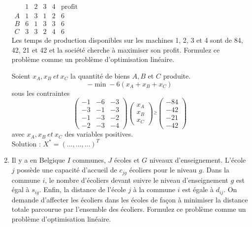 \begin{enumerate}
    $
    \begin{array}{l|llll|l}
      & 1 & 2 & 3 & 4 & \mbox{profit}\\
      \hline
      A & 1 & 3 & 1 & 2 & 6\\
      B & 6 & 1 & 3 & 3 & 6\\
      C & 3 & 3 & 2 & 4 & 6
    \end{array}
    $
    \\


    Les temps de production disponibles sur les machines 1, 2, 3 et 4  sont de 84, 42, 21 et 42 et la société cherche à  maximiser son
    profit. Formulez ce problème comme un problème d'optimisation linéaire.

    \begin{solution}
      Soient $x_{A}, x_{B}~et~x_{C}$ la quantité de biens $A, B$ et $C$ produite. \\
      $$- \min -6(x_{A} + x_{B} + x_{C})$$
      sous les contraintes \\
      \[
        \begin{pmatrix}
          -1 & -6 & -3\\
          -3 & -1 & -3\\
          -1 & -3 & -2\\
          -2 & -3 & -4
        \end{pmatrix}
        \begin{pmatrix}
          x_{A}\\
          x_{B}\\
          x_{C}
        \end{pmatrix}
        \stackrel{\ge}{}
        \begin{pmatrix}
          -84\\
          -42\\
          -21\\
          -42
        \end{pmatrix}
      \]
      avec $x_{A}, x_{B}~et~x_{C}$ des variables positives.\\
      \newline
      Solution : $X^{*} = (...,...,...)^{T}$

    \end{solution}


  \item Il y a en Belgique $I$ communes, $J$ écoles et $G$ niveaux
    d'enseignement. L'école $j$ possède  une capacité d'accueil de $c_{jg}$
    écoliers pour le niveau $g$. Dans la commune $i$, le nombre d'écoliers devant
    suivre le niveau d'enseignement $g$ est égal à $s_{ig}$. Enfin, la distance de
    l'école $j$ à la commune $i$ est égale à $d_{ij}$. On demande d'affecter les écoliers dans les écoles de façon à minimiser la
    distance totale parcourue par l'ensemble des écoliers. Formulez ce problème comme un problème d'optimisation linéaire.



\end{enumerate}
